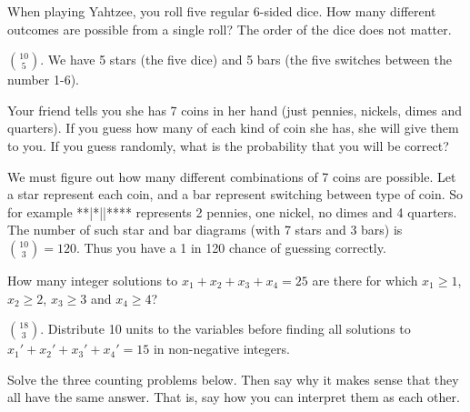 \begin{questions}
\question When playing Yahtzee, you roll five regular 6-sided dice.  How many different outcomes are possible from a single roll?  The order of the dice does not matter.

	\begin{answer}
	${10 \choose 5}$.  We have 5 stars (the five dice) and 5 bars (the five switches between the number 1-6).
	\end{answer}



\question Your friend tells you she has 7 coins in her hand (just pennies, nickels, dimes and quarters).  If you guess how many of each kind of coin she has, she will give them to you.  If you guess randomly, what is the probability that you will be correct?

	\begin{answer}
	 We must figure out how many different combinations of 7 coins are possible.  Let a star represent each coin, and a bar represent switching between type of coin.  So for example **|*||**** represents 2 pennies, one nickel, no dimes and 4 quarters.  The number of such star and bar diagrams (with 7 stars and 3 bars) is ${10 \choose 3} = 120$.  Thus you have a 1 in 120 chance of guessing correctly.
	\end{answer}



\question How many integer solutions to $x_1 + x_2 + x_3 + x_4  = 25$ are there for which $x_1 \ge 1$, $x_2 \ge 2$, $x_3 \ge 3$  and $x_4 \ge 4$?

	\begin{answer}
	${18 \choose 3}$.  Distribute 10 units to the variables before finding all solutions to $x_1' + x_2' + x_3' + x_4' = 15$ in non-negative integers.
	\end{answer}





\question Solve the three counting problems below.  Then say why it makes sense that they all have the same answer.  That is, say how you can interpret them as each other.

\end{questions}
